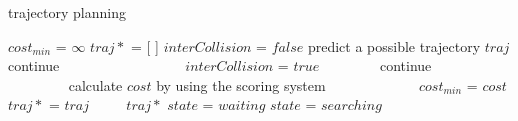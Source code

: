 \begin{algorithm}[t]
\caption{trajectory planning} 
\begin{algorithmic}[1]
\State $cost_{min}$ = $\infty$
\State$traj*$ = [ ]
\State $interCollision$ = $false$
        \State predict a possible trajectory $traj$
    　　　　\State continue
    　　\EndIf
    　　　　\State $interCollision$ = $true$
    　　　　\State continue
    　　\EndIf
    　　\State calculate $cost$ by using the scoring system 
    　　　　\State $cost_{min}$ = $cost$
    　　　　\State $traj*$ = $traj$
    　　\EndIf
    \EndFor
\EndFor
{}
    \State \Return $traj*$
        \State \Return $state$ = $waiting$
    \EndIf
\EndIf
\State \Return $state$ = $searching$
\end{algorithmic}
\end{algorithm}

